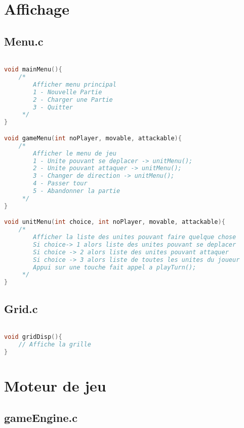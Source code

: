\documentclass[a4paper,10pt]{extreport}
\begin{document}
\part{Affichage}

\chapter{Menu.c}
\vspace{-1cm}

\begin{lstlisting}[language=c]

void mainMenu(){
	/*
		Afficher menu principal
		1 - Nouvelle Partie
		2 - Charger une Partie
		3 - Quitter
	 */
}

void gameMenu(int noPlayer, movable, attackable){
	/*
		Afficher le menu de jeu
		1 - Unite pouvant se deplacer -> unitMenu();
		2 - Unite pouvant attaquer -> unitMenu();
		3 - Changer de direction -> unitMenu();
		4 - Passer tour
		5 - Abandonner la partie
	 */
}

void unitMenu(int choice, int noPlayer, movable, attackable){
	/*
		Afficher la liste des unites pouvant faire quelque chose
		Si choice-> 1 alors liste des unites pouvant se deplacer
		Si choice -> 2 alors liste des unites pouvant attaquer
		Si choice -> 3 alors liste de toutes les unites du joueur
		Appui sur une touche fait appel a playTurn();
	 */
}
\end{lstlisting}

\chapter{Grid.c}
\vspace{-1cm}

\begin{lstlisting}[language=c]

void gridDisp(){
	// Affiche la grille
}

\end{lstlisting}

\part{Moteur de jeu}

\chapter{gameEngine.c}
\vspace{-1cm}
\end{document}
